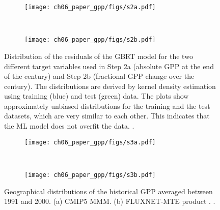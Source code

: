 \begin{figure}[p]
  \centering
  \begin{subfigure}[b]{\SubfigureWidth{}}
    \texttt{[image: ch06\_paper\_gpp/figs/s2a.pdf]}
    \caption{}
    \label{fig:app:b:residuals:a}
  \end{subfigure}
  ~
  \begin{subfigure}[b]{\SubfigureWidth{}}
    \texttt{[image: ch06\_paper\_gpp/figs/s2b.pdf]}
    \caption{}
    \label{fig:app:b:residuals:b}
  \end{subfigure}
  \caption[
    Distribution of the residuals of the \acf{GBRT} model for the two different
    target variables used in Step 2a and Step 2b.
  ]{
    Distribution of the residuals of the \acf{GBRT} model for the two different
    target variables used in Step 2a (absolute \acf{GPP} at the end of the
     century) and Step 2b (fractional \acs{GPP} change over the
     century). The distributions are derived by kernel density
    estimation using training (blue) and test (green) data. The plots show
    approximately unbiased distributions for the training and the test
    datasets, which are very similar to each other. This indicates that the
    \acl{ML} model does not overfit the data. .
  }
  \label{fig:app:b:residuals}
\end{figure}

\begin{figure}[p]
  \centering
  \begin{subfigure}[b]{\SubfigureWidth{}}
    \texttt{[image: ch06\_paper\_gpp/figs/s3a.pdf]}
    \caption{}
    \label{fig:app:b:cmip5_hist_mte:a}
  \end{subfigure}
  ~
  \begin{subfigure}[b]{\SubfigureWidth{}}
    \texttt{[image: ch06\_paper\_gpp/figs/s3b.pdf]}
    \caption{}
    \label{fig:app:b:cmip5_hist_mte:b}
  \end{subfigure}
  \caption[
    Geographical distributions of the historical \acf{GPP} averaged between
    1991 and 2000.
  ]{
    Geographical distributions of the historical \acf{GPP} averaged between
    1991 and 2000. (a) C\acs{MIP}5 \acf{MMM}. (b) FLUXNET-MTE product
    \autocite{Jung2011}. .
  }
  \label{fig:app:b:cmip5_hist_mte}
\end{figure}

